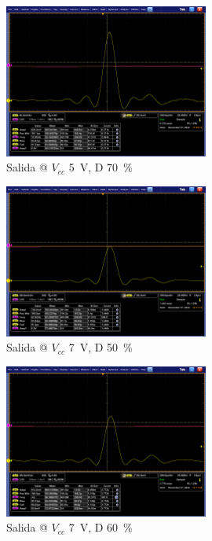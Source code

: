 \begin{figure}
  \centering
    \includegraphics[width=0.6\textwidth]{images/mediciones/vcc_5v_duty_70.png}
    \caption{Salida @ $V_{cc}$ \qty{5}{\volt}, D \qty{70}{\percent} }
    \label{fig:mediciones_5v_70}
\end{figure}

\begin{figure}
  \centering
    \includegraphics[width=0.6\textwidth]{images/mediciones/vcc_7v_duty_50.png}
    \caption{Salida @ $V_{cc}$ \qty{7}{\volt}, D \qty{50}{\percent} }
    \label{fig:mediciones_7v_50}
\end{figure}

\begin{figure}
  \centering
    \includegraphics[width=0.6\textwidth]{images/mediciones/vcc_7v_duty_60.png}
    \caption{Salida @ $V_{cc}$ \qty{7}{\volt}, D \qty{60}{\percent} }
    \label{fig:mediciones_7v_60}
\end{figure}

